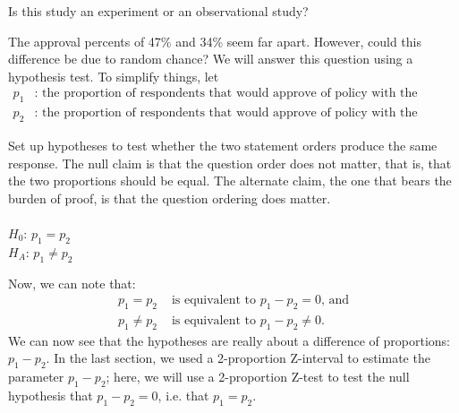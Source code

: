 \begin{exercisewrap}
\begin{nexercise}
Is this study an experiment or an observational study?\footnotemark
\end{nexercise}
\end{exercisewrap}

\noindent The approval percents of 47\% and 34\% seem far apart.  However, could this difference be due to random chance?  We will answer this question using a hypothesis test.  To simplify things, let 
\begin{align*}
p_1& \text{: the proportion of respondents that would approve of policy with the original statement ordering, and }\\
p_2& \text{: the proportion of respondents that would approve of policy with the reversed statement ordering.}
\end{align*}

\begin{examplewrap}
\begin{nexample}{Set up hypotheses to test whether the two statement orders produce the same response. }
The null claim is that the question order does not matter, that is, that the two proportions should be equal.  The alternate claim, the one that bears the burden of proof, is that the question ordering does matter.  \\
\\
$H_0$: $p_1 =  p_2$ \\ $H_A$: $p_1 \ne  p_2$
\end{nexample}
\end{examplewrap}

\D{\newpage}

\noindent%
Now, we can note that:
\begin{align*}
p_1=p_2 &\text{ is equivalent to } p_1-p_2=0\text{, and} \\
p_1\ne p_2 &\text{ is equivalent to } p_1-p_2\ne 0.  
\end{align*}
We can now see that the hypotheses are really about a difference of proportions: $p_1-p_2$.  In the last section, we used a 2-proportion Z-interval to estimate the parameter $p_1-p_2$; here, we will use a 2-proportion Z-test to test the null hypothesis that $p_1-p_2=0$, i.e. that $p_1=p_2$.

